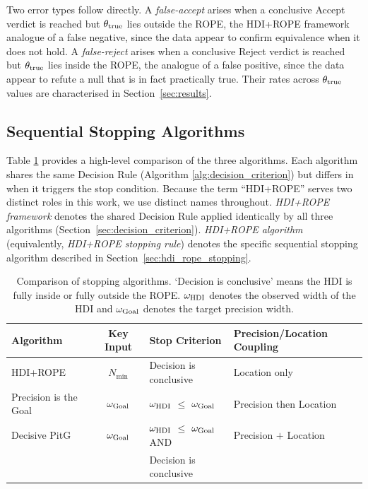 Two error types follow directly.
A \textit{false-accept} arises when a conclusive Accept verdict is reached but
$\theta_{\rm true}$ lies outside the ROPE, the HDI+ROPE framework analogue of a false
negative, since the data appear to confirm equivalence when it does not hold.
A \textit{false-reject} arises when a conclusive Reject verdict is reached but
$\theta_{\rm true}$ lies inside the ROPE, the analogue of a false positive, since
the data appear to refute a null that is in fact practically true.
Their rates across $\theta_{\rm true}$ values are characterised in
Section~\ref{sec:results}.

\subsection{Sequential Stopping Algorithms}\label{sec:sequential_stopping_algorithms}

Table \ref{tab:comparison} provides a high-level comparison of the three algorithms.
Each algorithm shares the same Decision Rule (Algorithm \ref{alg:decision_criterion})
but differs in when it triggers the stop condition.
Because the term ``HDI+ROPE'' serves two distinct roles in this work, we use distinct names
throughout. \textit{HDI+ROPE framework} denotes the shared Decision Rule applied
identically by all three algorithms (Section~\ref{sec:decision_criterion}).
\textit{HDI+ROPE algorithm} (equivalently, \textit{HDI+ROPE stopping rule}) denotes
the specific sequential stopping algorithm described in
Section~\ref{sec:hdi_rope_stopping}.

\begin{table}[h!]
    \begin{center}
      \begin{tabular}{l|c|l|l}
        \textbf{Algorithm} & \textbf{Key Input} & \textbf{Stop Criterion} &  \textbf{Precision/Location Coupling} \\
        \hline
        HDI+ROPE & $N_\mathrm{min}$ & Decision is conclusive & Location only \\
        Precision is the Goal & $\omega_{\rm Goal}$ & $\omega_{\rm HDI}$ $\le$ $\omega_{\rm Goal}$ & Precision then Location \\
        Decisive PitG & $\omega_{\rm Goal}$ & $\omega_{\rm HDI}$ $\le$ $\omega_{\rm Goal}$ AND & Precision $+$ Location \\
         & & Decision is conclusive & \\
      \end{tabular}
      \caption{Comparison of stopping algorithms. `Decision is conclusive' means the HDI
      is fully inside or fully outside the ROPE. $\omega_{\rm HDI}$ denotes the observed
      width of the HDI and $\omega_{\rm Goal}$ denotes the target precision width.}
      \label{tab:comparison}
    \end{center}
  \end{table}

